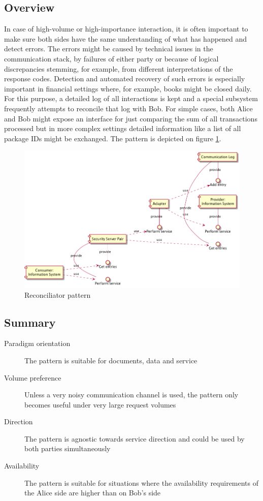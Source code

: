 \documentclass[10pt,a4paper]{article}
\begin{document}
\subsection{Overview}
In case of high-volume or high-importance interaction, it is often important to make sure both sides have the same understanding of what has happened and detect errors. The errors might be caused by technical issues in the communication stack, by failures of either party or because of logical discrepancies stemming, for example, from different interpretations of the response codes. Detection and automated recovery of such errors is especially important in financial settings where, for example, books might be closed daily. For this purpose, a detailed log of all interactions is kept and a special subsystem frequently attempts to reconcile that log with Bob. For simple cases, both Alice and Bob might expose an interface for just comparing the sum of all transactions processed but in more complex settings detailed information like a list of all package IDs might be exchanged. The pattern is depicted on figure \ref{fig:p:9}.
\begin{figure}[htp]
	\begin{center}
		\includegraphics[width=1\textwidth]{9_comp.png}
		\caption{Reconciliator pattern}
		\label{fig:p:9}
	\end{center}
\end{figure}

\subsection{Summary}
\begin{description}
	\item[Paradigm orientation] The pattern is suitable for documents, data and service
	\item[Volume preference] Unless a very noisy communication channel is used, the pattern only becomes useful under very large request volumes
	\item[Direction] The pattern is agnostic towards service direction and could be used by both parties simultaneously
	\item[Availability] The pattern is suitable for situations where the availability requirements of the Alice side are higher than on Bob's side
\end{description}
\end{document}
